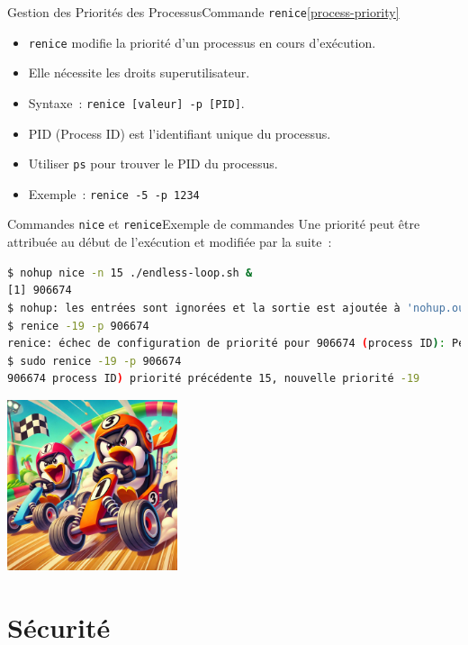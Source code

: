 \documentclass{beamer}
\begin{document}
    \begin{frame}{Gestion des Priorités des Processus}{Commande \lstinline{renice}\cref{process-priority}}
        \begin{itemize}
            \item \lstinline{renice} modifie la priorité d'un processus en cours d'exécution.
            \item Elle nécessite les droits superutilisateur.
            \item Syntaxe~: \lstinline{renice [valeur] -p [PID]}.
            \item PID (Process ID) est l'identifiant unique du processus.
            \item Utiliser \lstinline{ps} pour trouver le PID du processus.
            \item Exemple~: \lstinline{renice -5 -p 1234}
        \end{itemize}
    \end{frame}

    \begin{frame}[fragile]{Commandes \lstinline{nice} et \lstinline{renice}}{Exemple de commandes}
        Une priorité peut être attribuée au début de l'exécution et modifiée par la suite~:
        \begin{lstlisting}[language=bash]
$ nohup nice -n 15 ./endless-loop.sh &
[1] 906674
$ nohup: les entrées sont ignorées et la sortie est ajoutée à 'nohup.out'
$ renice -19 -p 906674
renice: échec de configuration de priorité pour 906674 (process ID): Permission non accordée
$ sudo renice -19 -p 906674
906674 process ID) priorité précédente 15, nouvelle priorité -19
        \end{lstlisting}
        \begin{center}
            \includegraphics[width=5cm]{image/pinguins-racing}
        \end{center}
    \end{frame}


    \section{Sécurité}\label{sec:security}
\end{document}
